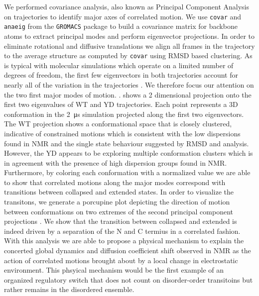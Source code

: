 We performed covariance analysis, also known as Principal Component Analysis on \gct{} trajectories to identify major axes of correlated motion. We use \texttt{covar} and \texttt{anaeig} from the \texttt{GROMACS} package to build a covariance matrix for backbone atoms to extract principal modes and perform eigenvector projections. In order to eliminate rotational and diffusive  translations we align all frames in the trajectory to the average structure as computed by \texttt{covar} using RMSD based clustering. As is typical with molecular simulations which operate on a limited number of degrees of freedom, the first few eigenvectors in both trajectories account for nearly all of the variation in the trajectories . We therefore focus our attention on the two first major modes of motion. .  shows a 2 dimensional projection onto the first two eigenvalues of WT and YD trajectories. Each point represents a 3D conformation in the \SI{2}{\us} simulation projected along the first two eigenvectors. The WT projection shows a conformational space that is closely clustered, indicative of constrained motions which is consistent with the low dispersions found in NMR and the single state behaviour suggested by RMSD and \diffusion{} analysis. However, the YD appears to be exploring  multiple conformation clusters which is in agreement with the presence of high dispersion groups found in NMR. Furthermore, by coloring each conformation with a normalized \diffusion{} value we are able to show that correlated motions along the major modes correspond with transitions between collapsed and extended states. In order to visualize the transitons, we generate a porcupine plot depicting the direction of motion between conformations on two extremes of the second principal component projections .  We show that the transition between collapsed and extended is indeed driven by a separation of the N and C termius in a correlated fashion.  With this analysis we are able to propose a physical mechanism to explain the concerted global dynamics and diffusion coefficient shift observed in NMR as the action of correlated motions brought about by a local change in electrostatic environment. This phsyical mechanism would be the first example of an organized regulatory switch that does not count on disorder-order transitoins but rather remains in the disordered ensemble. 





